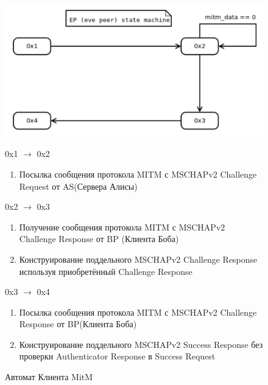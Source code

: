 \documentclass[oneside, final, 14pt]{extarticle}
\begin{document}
\begin{figure}
  \centering
  \includegraphics[scale=0.5]
    {res/eve-peer-mitm-state-machine-diagram.png}

  0x1 $\rightarrow$ 0x2
  \begin{enumerate}
    \item Посылка сообщения протокола MITM с MSCHAPv2 Challenge
      Request от AS(Сервера Алисы)
  \end{enumerate}

  0x2 $\rightarrow$ 0x3
  \begin{enumerate}
    \item Получение сообщения протокола MITM с MSCHAPv2 Challenge
      Response от BP (Клиента Боба)
    \item Конструирование поддельного MSCHAPv2 Challenge
      Response используя приобретённый Challenge Response
  \end{enumerate}

  0x3 $\rightarrow$ 0x4
  \begin{enumerate}
    \item Посылка сообщения протокола MITM с MSCHAPv2 Challenge
      Response от BP(Клиента Боба)
    \item Конструирование поддельного MSCHAPv2 Success
      Response без проверки Authenticator Response в Success Request
  \end{enumerate}
  \caption{Автомат Клиента MitM}
\end{figure}
\end{document}
